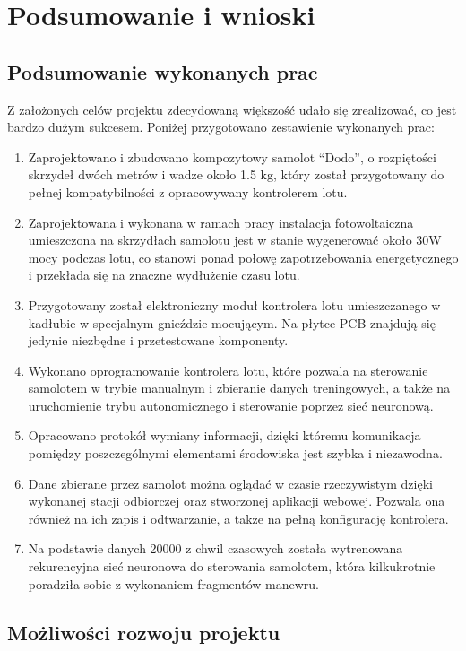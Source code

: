 \documentclass[12pt, a4paper]{article}
\begin{document}
\clearpage
\section{Podsumowanie i wnioski}

\subsection{Podsumowanie wykonanych prac}
Z założonych celów projektu zdecydowaną większość udało się zrealizować, co jest bardzo dużym sukcesem. Poniżej przygotowano zestawienie wykonanych prac:
\begin{enumerate}
\item Zaprojektowano i zbudowano kompozytowy samolot ``Dodo'', o rozpiętości skrzydeł dwóch metrów i wadze około 1.5 kg, który został przygotowany do pełnej kompatybilności z opracowywany kontrolerem lotu. 
\item Zaprojektowana i wykonana w ramach pracy instalacja fotowoltaiczna umieszczona na skrzydłach samolotu jest w stanie wygenerować około 30W mocy podczas lotu, co stanowi ponad połowę zapotrzebowania energetycznego i przekłada się na znaczne wydłużenie czasu lotu.
\item Przygotowany został elektroniczny moduł kontrolera lotu umieszczanego w kadłubie w specjalnym gnieździe mocującym. Na płytce PCB znajdują się jedynie niezbędne i przetestowane komponenty.
\item Wykonano oprogramowanie kontrolera lotu, które pozwala na sterowanie samolotem w trybie manualnym i zbieranie danych treningowych, a także na uruchomienie trybu autonomicznego i sterowanie poprzez sieć neuronową.
\item Opracowano protokół wymiany informacji, dzięki któremu komunikacja pomiędzy poszczególnymi elementami środowiska jest szybka i niezawodna.
\item Dane zbierane przez samolot można oglądać w czasie rzeczywistym dzięki wykonanej stacji odbiorczej oraz stworzonej aplikacji webowej. Pozwala ona również na ich zapis i odtwarzanie, a także na pełną konfigurację kontrolera.
\item Na podstawie danych 20000 z chwil czasowych została wytrenowana rekurencyjna sieć neuronowa do sterowania samolotem, która kilkukrotnie poradziła sobie z wykonaniem fragmentów manewru.

\end{enumerate}


\subsection{Możliwości rozwoju projektu}
\end{document}
